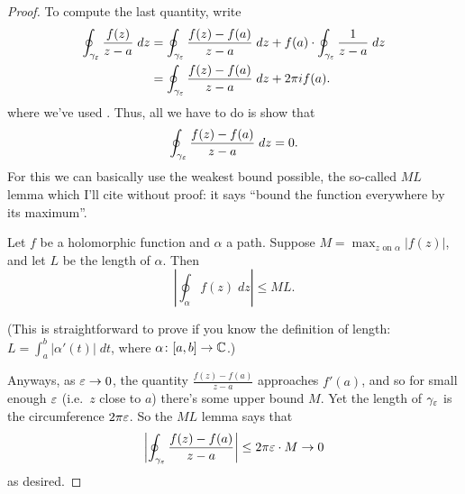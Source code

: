 \begin{proof}
	To compute the last quantity, write
	\begin{align*}
		\oint_{\gamma_\varepsilon} \frac{f(z)}{z-a} \; dz
		&=
		\oint_{\gamma_\varepsilon} \frac{f(z)-f(a)}{z-a} \; dz
		+
		f(a) \cdot \oint_{\gamma_\varepsilon} \frac{1}{z-a} \; dz \\
		&=
		\oint_{\gamma_\varepsilon} \frac{f(z)-f(a)}{z-a} \; dz
		+
		2\pi i f(a).
	\end{align*}
	where we've used .
	Thus, all we have to do is show that
	\[ \oint_{\gamma_\varepsilon} \frac{f(z)-f(a)}{z-a} \; dz = 0. \]
	For this we can basically use the weakest bound possible, the so-called $ML$ lemma
	which I'll cite without proof:
	it says ``bound the function everywhere by its maximum''.
	\begin{lemma}
		Let $f$ be a holomorphic function and $\alpha$ a path.
		Suppose $M = \max_{z \text{ on } \alpha} \left\lvert f(z) \right\rvert$, and
		let $L$ be the length of $\alpha$.
		Then
		\[ \left\lvert \oint_\alpha f(z) \; dz \right\rvert \le ML. \]
	\end{lemma}
	(This is straightforward to prove if you know the definition of length:
	$L = \int_a^b |\alpha'(t)| \; dt$, where $\alpha \colon [a,b] \to \mathbb C$.)

	Anyways, as $\varepsilon \to 0$, the quantity $\frac{f(z)-f(a)}{z-a}$ approaches $f'(a)$,
	and so for small enough $\varepsilon$ (i.e.\ $z$ close to $a$) there's some upper bound $M$.
	Yet the length of $\gamma_\varepsilon$ is the circumference $2\pi \varepsilon$.
	So the $ML$ lemma says that
	\[ \left\lvert \oint_{\gamma_\varepsilon} \frac{f(z)-f(a)}{z-a} \right\rvert
		\le 2\pi\varepsilon \cdot M \to 0
	\]
	as desired.
\end{proof}

